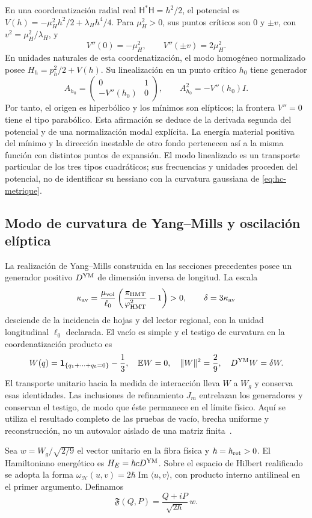 En una coordenatización radial real \(\mathsf H^*\mathsf H=h^2/2\), el potencial
es \(V(h)=-\mu_H^2h^2/2+\lambda_Hh^4/4\). Para
\(\mu_H^2>0\), sus puntos críticos son \(0\) y
\(\pm v\), con \(v^2=\mu_H^2/\lambda_H\), y
\[
 V''(0)=-\mu_H^2,\qquad V''(\pm v)=2\mu_H^2.
\]
En unidades naturales de esta coordenatización, el modo homogéneo normalizado posee
\(H_h=p_h^2/2+V(h)\). Su linealización en un punto crítico \(h_0\)
tiene generador
\[
 A_{h_0}=\begin{pmatrix}0&1\\-V''(h_0)&0\end{pmatrix},
 \qquad A_{h_0}^2=-V''(h_0)I.
\]
Por tanto, el origen es hiperbólico y los mínimos son elípticos; la
frontera \(V''=0\) tiene el tipo parabólico. Esta afirmación se deduce
de la derivada segunda del potencial y de una normalización modal
explícita. La energía material positiva del mínimo y la dirección
inestable de otro fondo pertenecen así a la misma función con distintos
puntos de expansión. El modo linealizado es un transporte particular de
los tres tipos cuadráticos; sus frecuencias y unidades proceden del
potencial, no de identificar su hessiano con la curvatura gaussiana de
\eqref{eq:hc-metrique}.

\subsection{Modo de curvatura de Yang--Mills y oscilación elíptica}

La realización de Yang--Mills construida en las secciones precedentes
posee un generador positivo \(D^{\rm YM}\) de dimensión inversa de
longitud. La escala
\[
 \kappa_{\rm av}=\frac{\mu_{\rm vol}}{\ell_0}
 \left(\frac{\pi_{\rm HMT}}{\varphi_{\rm HMT}^2}-1\right)>0,
 \qquad \delta=3\kappa_{\rm av}
\]
desciende de la incidencia de hojas y del lector regional, con la unidad
longitudinal \(\ell_0\) declarada. El vacío es simple y el testigo de
curvatura en la coordenatización producto es
\[
 W(q)=\mathbf1_{\{q_1+\cdots+q_6=0\}}-\frac13,
 \quad \mathbb EW=0,\quad \|W\|^2=\frac29,
 \quad D^{\rm YM}W=\delta W.
\]
El transporte unitario hacia la medida de interacción lleva \(W\) a
\(W_g\) y conserva esas identidades. Las inclusiones de refinamiento
\(J_m\) entrelazan los generadores y conservan el testigo, de modo que
éste permanece en el límite físico. Aquí se utiliza el resultado completo
de las pruebas de vacío, brecha uniforme y reconstrucción, no un
autovalor aislado de una matriz finita~\cite{HMT-YM}.

Sea \(w=W_g/\sqrt{2/9}\) el vector unitario en la fibra física y
\(\hbar=\hbar_{\rm ret}>0\). El Hamiltoniano energético es
\(H_E=\hbar cD^{\rm YM}\). Sobre el espacio de Hilbert realificado
se adopta la forma \(\omega_{\mathcal H}(u,v)=2\hbar
\operatorname{Im}\langle u,v\rangle\), con producto interno antilineal
en el primer argumento. Definamos
\begin{equation}
 \mathfrak F(Q,P)=\frac{Q+iP}{\sqrt{2\hbar}}\,w.
 \label{eq:hc-ym-embedding}
\end{equation}

